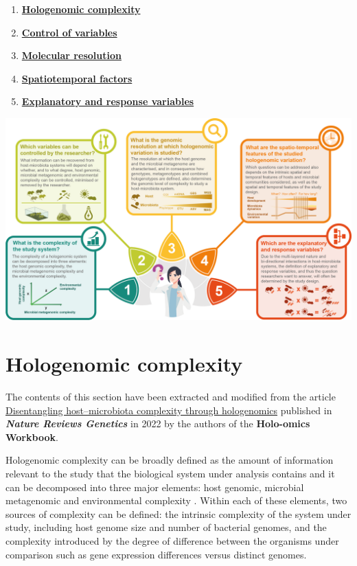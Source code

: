 \documentclass[
]{book}
\providecommand{\tightlist}{%
  \setlength{\itemsep}{0pt}\setlength{\parskip}{0pt}}
\begin{document}
\begin{enumerate}
\def\labelenumi{\arabic{enumi}.}
\tightlist
\item
  \textbf{\protect\hyperlink{hologenomic-complexity}{Hologenomic complexity}}
\item
  \textbf{\protect\hyperlink{control-of-variables}{Control of variables}}
\item
  \textbf{\protect\hyperlink{molecular-resolution}{Molecular resolution}}
\item
  \textbf{\protect\hyperlink{spatiotemporal-factors}{Spatiotemporal factors}}
\item
  \textbf{\protect\hyperlink{explanatory-and-response-variables}{Explanatory and response variables}}
\end{enumerate}

\includegraphics{images/holo-omics_five_questions.png}

\hypertarget{hologenomic-complexity}{%
\section{Hologenomic complexity}\label{hologenomic-complexity}}

The contents of this section have been extracted and modified from the article \href{https://www.nature.com/articles/s41576-021-00421-0}{Disentangling host--microbiota complexity through hologenomics} published in \textbf{\emph{Nature Reviews Genetics}} in 2022 by the authors of the \textbf{Holo-omics Workbook}.

Hologenomic complexity can be broadly defined as the amount of information relevant to the study that the biological system under analysis contains and it can be decomposed into three major elements: host genomic, microbial metagenomic and environmental complexity \citep{Alberdi2022-ay}. Within each of these elements, two sources of complexity can be defined: the intrinsic complexity of the system under study, including host genome size and number of bacterial genomes, and the complexity introduced by the degree of difference between the organisms under comparison such as gene expression differences versus distinct genomes.
\end{document}
